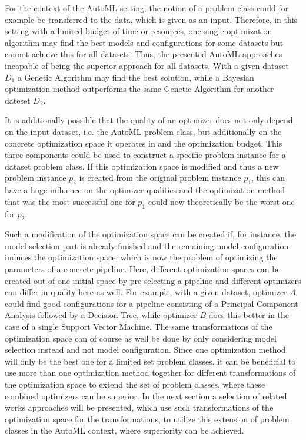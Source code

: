 For the context of the AutoML setting, the notion of a problem class could for example be transferred to the data, which is given as an input.
Therefore, in this setting with a limited budget of time or resources, one single optimization algorithm may find the best models and configurations for some datasets but cannot achieve this for all datasets.
Thus, the presented AutoML approaches incapable of being the superior approach for all datasets.
With a given dataset $D_1$ a Genetic Algorithm may find the best solution, while a Bayesian optimization method outperforms the same Genetic Algorithm for another dateset $D_2$.

It is additionally possible that the quality of an optimizer does not only depend on the input dataset, i.e. the AutoML problem class, but additionally on the concrete optimization space it operates in and the optimization budget.
This three components could be used to construct a specific problem instance for a dataset problem class.\newline
If this optimization space is modified and thus a new problem instance $p_2$ is created from the original problem instance $p_1$, this can have a huge influence on the optimizer qualities and the optimization method that was the most successful one for $p_1$ could now theoretically be the worst one for $p_2$.

Such a modification of the optimization space can be created if, for instance, the model selection part is already finished and the remaining model configuration induces the optimization space, which is now the problem of optimizing the parameters of a concrete pipeline.
Here, different optimization spaces can be created out of one initial space by pre-selecting a pipeline and different optimizers can differ in quality here as well.
For example, with a given dataset, optimizer $A$ could find good configurations for a pipeline consisting of a Principal Component Analysis followed by a Decision Tree, while optimizer $B$ does this better in the case of a single Support Vector Machine.
The same transformations of the optimization space can of course as well be done by only considering model selection instead and not model configuration.\newline
Since one optimization method will only be the best one for a limited set problem classes, it can be beneficial to use more than one optimization method together for different transformations of the optimization space to extend the set of problem classes, where these combined optimizers can be superior.\newline
In the next section a selection of related works approaches will be presented, which use such transformations of the optimization space for the transformations, to utilize this extension of problem classes in the AutoML context, where superiority can be achieved.

